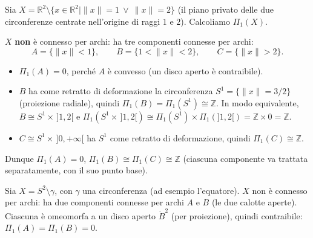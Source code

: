 \begin{ejemplo}
Sia $X = \mathbb{R}^2 \setminus \{ x \in \mathbb{R}^2 \mid \|x\| = 1 \ \lor\ \|x\| = 2 \}$ (il piano privato delle due circonferenze centrate nell'origine di raggi $1$ e $2$). Calcoliamo $\Pi_1(X)$.

\begin{center}
\end{center}

$X$ \textbf{non} \`e connesso per archi: ha tre componenti connesse per archi:
\[
A = \{\|x\| < 1\}, \qquad B = \{1 < \|x\| < 2\}, \qquad C = \{\|x\| > 2\}.
\]
\begin{itemize}
    \item $\Pi_1(A) = 0$, perch\'e $A$ \`e convesso (un disco aperto \`e contraibile).
    \item $B$ ha come retratto di deformazione la circonferenza $S^1 = \{\|x\| = 3/2\}$ (proiezione radiale), quindi $\Pi_1(B) = \Pi_1(S^1) \cong \mathbb{Z}$. In modo equivalente, $B \cong S^1 \times\, ]1,2[$ e $\Pi_1(S^1 \times\, ]1,2[) \cong \Pi_1(S^1) \times \Pi_1(]1,2[) = \mathbb{Z} \times 0 = \mathbb{Z}$.
    \item $C \cong S^1 \times\, ]0, +\infty[$ ha $S^1$ come retratto di deformazione, quindi $\Pi_1(C) \cong \mathbb{Z}$.
\end{itemize}
Dunque $\Pi_1(A) = 0$, $\Pi_1(B) \cong \Pi_1(C) \cong \mathbb{Z}$ (ciascuna componente va trattata separatamente, con il suo punto base).
\end{ejemplo}

\begin{ejemplo}
Sia $X = S^2 \setminus \gamma$, con $\gamma$ una circonferenza (ad esempio l'equatore). $X$ non \`e connesso per archi: ha due componenti connesse per archi $A$ e $B$ (le due calotte aperte). Ciascuna \`e omeomorfa a un disco aperto $\mathring{B}^2$ (per proiezione), quindi contraibile: $\Pi_1(A) = \Pi_1(B) = 0$.
\end{ejemplo}


